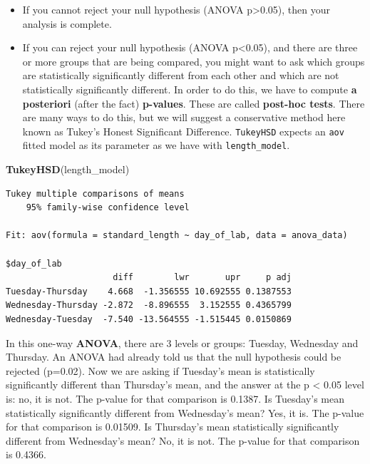 \documentclass[twoside, 12pt]{article}
\newenvironment{Shaded}{\begin{snugshade}}{\end{snugshade}}
\newcommand{\KeywordTok}[1]{\textcolor[rgb]{0.13,0.29,0.53}{\textbf{{#1}}}}
\newcommand{\NormalTok}[1]{{#1}}
\begin{document}
\begin{itemize}
\item
  If you cannot reject your null hypothesis (ANOVA p\textgreater{}0.05),
  then your analysis is complete.
\item
  If you can reject your null hypothesis (ANOVA p\textless{}0.05), and
  there are three or more groups that are being compared, you might want
  to ask which groups are statistically significantly different from
  each other and which are not statistically significantly different. In
  order to do this, we have to compute \textbf{a posteriori} (after the
  fact) \textbf{p-values}. These are called \textbf{post-hoc tests}.
  There are many ways to do this, but we will suggest a conservative
  method here known as Tukey's Honest Significant Difference.
  \texttt{TukeyHSD} expects an \texttt{aov} fitted model as its
  parameter as we have with \texttt{length\_model}.
\end{itemize}

\begin{Shaded}
\begin{Highlighting}[]
\KeywordTok{TukeyHSD}\NormalTok{(length_model)}
\end{Highlighting}
\end{Shaded}

\begin{Verbatim}[frame=single]
  Tukey multiple comparisons of means
    95% family-wise confidence level

Fit: aov(formula = standard_length ~ day_of_lab, data = anova_data)

$day_of_lab
                     diff        lwr       upr     p adj
Tuesday-Thursday    4.668  -1.356555 10.692555 0.1387553
Wednesday-Thursday -2.872  -8.896555  3.152555 0.4365799
Wednesday-Tuesday  -7.540 -13.564555 -1.515445 0.0150869
\end{Verbatim}

In this one-way \textbf{ANOVA}, there are 3 levels or groups: Tuesday,
Wednesday and Thursday. An ANOVA had already told us that the null
hypothesis could be rejected (p=0.02). Now we are asking if Tuesday's
mean is statistically significantly different than Thursday's mean, and
the answer at the p \textless{} 0.05 level is: no, it is not. The
p-value for that comparison is 0.1387. Is Tuesday's mean statistically
significantly different from Wednesday's mean? Yes, it is. The p-value
for that comparison is 0.01509. Is Thursday's mean statistically
significantly different from Wednesday's mean? No, it is not. The
p-value for that comparison is 0.4366.
\end{document}
